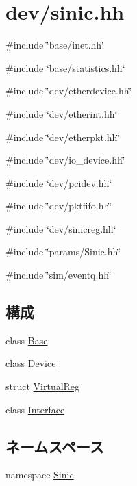 \hypertarget{sinic_8hh}{
\section{dev/sinic.hh}
\label{sinic_8hh}
}
{\ttfamily \#include \char`\"{}base/inet.hh\char`\"{}}\par
{\ttfamily \#include \char`\"{}base/statistics.hh\char`\"{}}\par
{\ttfamily \#include \char`\"{}dev/etherdevice.hh\char`\"{}}\par
{\ttfamily \#include \char`\"{}dev/etherint.hh\char`\"{}}\par
{\ttfamily \#include \char`\"{}dev/etherpkt.hh\char`\"{}}\par
{\ttfamily \#include \char`\"{}dev/io\_\-device.hh\char`\"{}}\par
{\ttfamily \#include \char`\"{}dev/pcidev.hh\char`\"{}}\par
{\ttfamily \#include \char`\"{}dev/pktfifo.hh\char`\"{}}\par
{\ttfamily \#include \char`\"{}dev/sinicreg.hh\char`\"{}}\par
{\ttfamily \#include \char`\"{}params/Sinic.hh\char`\"{}}\par
{\ttfamily \#include \char`\"{}sim/eventq.hh\char`\"{}}\par
\subsection*{構成}
\begin{DoxyCompactItemize}
\item 
class \hyperlink{classSinic_1_1Base}{Base}
\item 
class \hyperlink{classSinic_1_1Device}{Device}
\item 
struct \hyperlink{structSinic_1_1Device_1_1VirtualReg}{VirtualReg}
\item 
class \hyperlink{classSinic_1_1Interface}{Interface}
\end{DoxyCompactItemize}
\subsection*{ネームスペース}
\begin{DoxyCompactItemize}
\item 
namespace \hyperlink{namespaceSinic}{Sinic}
\end{DoxyCompactItemize}
